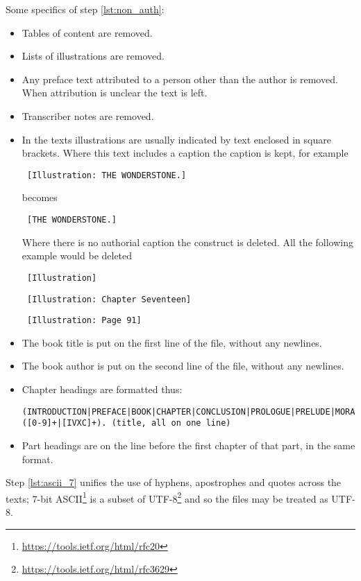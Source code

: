 \documentclass[a4paper,10pt]{paper}
\begin{document}
Some specifics of step \ref{lst:non_auth}:
\begin{itemize}
    \item Tables of content are removed.
    \item Lists of illustrations are removed.
    \item Any preface text attributed to a person other than the author is removed. When attribution is unclear the text is left.
    \item Transcriber notes are removed.
    \item In the texts illustrations are usually indicated by text enclosed in square brackets.
          Where this text includes a caption the caption is kept, for example
        \begin{verbatim} [Illustration: THE WONDERSTONE.] \end{verbatim}
          becomes
        \begin{verbatim} [THE WONDERSTONE.] \end{verbatim}
          Where there is no authorial caption the construct is deleted.
          All the following example would be deleted
        \begin{verbatim} [Illustration] \end{verbatim}
        \begin{verbatim} [Illustration: Chapter Seventeen] \end{verbatim}
        \begin{verbatim} [Illustration: Page 91] \end{verbatim}
    \item The book title is put on the first line of the file, without any newlines.
    \item The book author is put on the second line of the file, without any newlines.
    \item Chapter headings are formatted thus:
        \footnotesize{
        \begin{verbatim}(INTRODUCTION|PREFACE|BOOK|CHAPTER|CONCLUSION|PROLOGUE|PRELUDE|MORAL) ([0-9]+|[IVXC]+). (title, all on one line) \end{verbatim}
        }
    \item Part headings are on the line before the first chapter of that part, in the same format.
\end{itemize}

Step \ref{lst:ascii_7} unifies the use of hyphens, apostrophes and quotes across the texts; 7-bit ASCII\footnote{\url{https://tools.ietf.org/html/rfc20}} is a subset of UTF-8\footnote{\url{https://tools.ietf.org/html/rfc3629}} and so the files may be treated as UTF-8.
\end{document}
